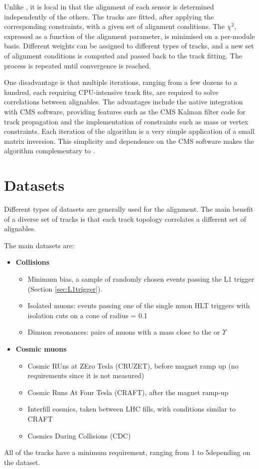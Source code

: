 Unlike \MPII, it is local in that the alignment of each sensor is determined independently of the others.
The tracks are fitted, after applying the corresponding constraints,
with a given set of alignment conditions.
The $\chi^2$, expressed as a function of the alignment parameter, is minimised on a per-module basis.
Different weights can be assigned to different types of tracks,
and a new set of alignment conditions is computed and passed back to the track fitting.
The process is repeated until convergence is reached.

One disadvantage is that multiple iterations,
ranging from a few dozens to a hundred,
each requiring CPU-intensive track fits,
are required to solve correlations between alignables.
The advantages include the native integration with CMS software, providing features such as
the CMS Kalman filter code for track propagation
and the implementation of constraints such as mass or vertex constraints.
Each iteration of the algorithm is a very simple application of a small matrix inversion.
This simplicity and dependence on the CMS software makes the \HIPPY algorithm complementary to \MPII.

\section{Datasets}
Different types of datasets are generally used for the alignment.
The main benefit of a diverse set of tracks is that each track topology correlates a different set of alignables.

The main datasets are:
\begin{itemize}
\item \textbf{Collisions}
  \begin{itemize}
  \item Minimum bias, a sample of randomly chosen events passing the L1 trigger (Section \ref{sec:L1trigger}).
  \item Isolated muons: events passing one of the single muon HLT triggers with isolation cuts on a cone of radius \DR = 0.1
  \item Dimuon resonances: pairs of muons with a mass close to the \PZ or $\Upsilon$ %
  \end{itemize}
\item \textbf{Cosmic muons}
  \begin{itemize}
  \item Cosmic RUns at ZEro Tesla (CRUZET), before magnet ramp up (no \pt requirements since it is not measured)
  \item Cosmic Runs At Four Tesla (CRAFT), after the magnet ramp-up
  \item Interfill cosmics, taken between LHC fills, with conditions similar to CRAFT
  \item Cosmics During Collisions (CDC)
  \end{itemize}
\end{itemize}
All of the tracks have a minimum \pt requirement, ranging from 1 to 5\GeV depending on the dataset.

